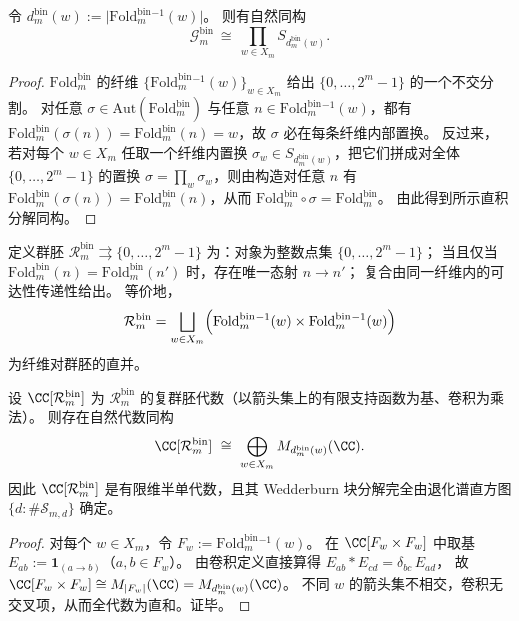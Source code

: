 \begin{proposition}[纤维置换分解]\label{prop:fold-bin-gauge-decomposition}
令 \(d^{\mathrm{bin}}_m(w):=\bigl|\mathrm{Fold}^{\mathrm{bin}}_m{}^{-1}(w)\bigr|\)。
则有自然同构
\[
\mathcal{G}^{\mathrm{bin}}_m\ \cong\ \prod_{w\in X_m} S_{d^{\mathrm{bin}}_m(w)}.
\]
\end{proposition}
\begin{proof}
\(\mathrm{Fold}^{\mathrm{bin}}_m\) 的纤维 \(\{\mathrm{Fold}^{\mathrm{bin}}_m{}^{-1}(w)\}_{w\in X_m}\) 给出 \(\{0,\dots,2^m-1\}\) 的一个不交分割。
对任意 \(\sigma\in\mathrm{Aut}(\mathrm{Fold}^{\mathrm{bin}}_m)\) 与任意 \(n\in \mathrm{Fold}^{\mathrm{bin}}_m{}^{-1}(w)\)，都有
\(\mathrm{Fold}^{\mathrm{bin}}_m(\sigma(n))=\mathrm{Fold}^{\mathrm{bin}}_m(n)=w\)，故 \(\sigma\) 必在每条纤维内部置换。
反过来，若对每个 \(w\in X_m\) 任取一个纤维内置换 \(\sigma_w\in S_{d^{\mathrm{bin}}_m(w)}\)，把它们拼成对全体 \(\{0,\dots,2^m-1\}\) 的置换 \(\sigma=\prod_w\sigma_w\)，则由构造对任意 \(n\) 有 \(\mathrm{Fold}^{\mathrm{bin}}_m(\sigma(n))=\mathrm{Fold}^{\mathrm{bin}}_m(n)\)，从而 \(\mathrm{Fold}^{\mathrm{bin}}_m\circ\sigma=\mathrm{Fold}^{\mathrm{bin}}_m\)。
由此得到所示直积分解同构。
\end{proof}

\begin{definition}\label{def:fold-bin-fiber-groupoid}
定义群胚 \(\mathcal{R}^{\mathrm{bin}}_m\rightrightarrows \{0,\dots,2^m-1\}\) 为：对象为整数点集 \(\{0,\dots,2^m-1\}\)；
当且仅当 \(\mathrm{Fold}^{\mathrm{bin}}_m(n)=\mathrm{Fold}^{\mathrm{bin}}_m(n')\) 时，存在唯一态射 \(n\to n'\)；
复合由同一纤维内的可达性传递性给出。
等价地，
\[
\mathcal{R}^{\mathrm{bin}}_m
=\bigsqcup_{w\in X_m}\Bigl(\mathrm{Fold}^{\mathrm{bin}}_m{}^{-1}(w)\times \mathrm{Fold}^{\mathrm{bin}}_m{}^{-1}(w)\Bigr)
\]
为纤维对群胚的直并。
\end{definition}

\begin{proposition}\label{prop:fold-bin-groupoid-algebra-wedderburn}
设 \(\CC[\mathcal{R}^{\mathrm{bin}}_m]\) 为 \(\mathcal{R}^{\mathrm{bin}}_m\) 的复群胚代数（以箭头集上的有限支持函数为基、卷积为乘法）。
则存在自然代数同构
\[
\CC[\mathcal{R}^{\mathrm{bin}}_m]\ \cong\ \bigoplus_{w\in X_m} M_{d^{\mathrm{bin}}_m(w)}(\CC).
\]
因此 \(\CC[\mathcal{R}^{\mathrm{bin}}_m]\) 是有限维半单代数，且其 Wedderburn 块分解完全由退化谱直方图 \(\{d:\#\mathcal{S}_{m,d}\}\) 确定。
\end{proposition}
\begin{proof}
对每个 \(w\in X_m\)，令 \(F_w:=\mathrm{Fold}^{\mathrm{bin}}_m{}^{-1}(w)\)。
在 \(\CC[F_w\times F_w]\) 中取基
\(
E_{ab}:=\mathbf{1}_{(a\to b)}
\)（\(a,b\in F_w\)）。
由卷积定义直接算得
\(
E_{ab}*E_{cd}=\delta_{bc}\,E_{ad}
\)，
故 \(\CC[F_w\times F_w]\cong M_{|F_w|}(\CC)=M_{d^{\mathrm{bin}}_m(w)}(\CC)\)。
不同 \(w\) 的箭头集不相交，卷积无交叉项，从而全代数为直和。证毕。
\end{proof}

